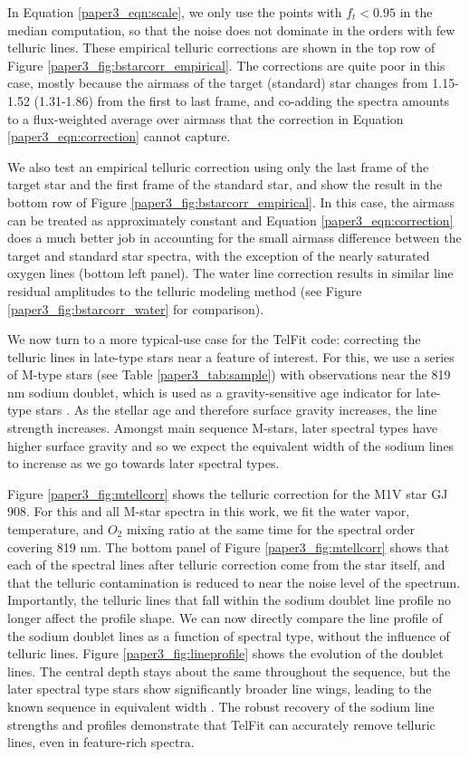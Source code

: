 In Equation \ref{paper3_eqn:scale}, we only use the points with $f_t < 0.95$ in the median computation, so that the noise does not dominate in the orders with few telluric lines. These empirical telluric corrections are shown in the top row of Figure \ref{paper3_fig:bstarcorr_empirical}. The corrections are quite poor in this case, mostly because the airmass of the target (standard) star changes from 1.15-1.52 (1.31-1.86) from the first to last frame, and co-adding the spectra amounts to a flux-weighted average over airmass that the correction in Equation \ref{paper3_eqn:correction} cannot capture. 

We also test an empirical telluric correction using only the last frame of the target star and the first frame of the standard star, and show the result in the bottom row of Figure \ref{paper3_fig:bstarcorr_empirical}. In this case, the airmass can be treated as approximately constant and Equation \ref{paper3_eqn:correction} does a much better job in accounting for the small airmass difference between the target and standard star spectra, with the exception of the nearly saturated oxygen lines (bottom left panel). The water line correction results in similar line residual amplitudes to the telluric modeling method (see Figure \ref{paper3_fig:bstarcorr_water} for comparison).


We now turn to a more typical-use case for the TelFit code: correcting the telluric lines in late-type stars near a feature of interest. For this, we use a series of M-type stars (see Table \ref{paper3_tab:sample}) with observations near the 819 nm sodium doublet, which is used as a gravity-sensitive age indicator for late-type stars \citep{Slesnick2006}. As the stellar age and therefore surface gravity increases, the line strength increases. Amongst main sequence M-stars, later spectral types have higher surface gravity and so we expect the equivalent width of the sodium lines to increase as we go towards later spectral types. 


Figure \ref{paper3_fig:mtellcorr} shows the telluric correction for the M1V star GJ 908. For this and all M-star spectra in this work, we fit the water vapor, temperature, and $O_2$ mixing ratio at the same time for the spectral order covering 819 nm. The bottom panel of Figure \ref{paper3_fig:mtellcorr} shows that each of the spectral lines after telluric correction come from the star itself, and that the telluric contamination is reduced to near the noise level of the spectrum. Importantly, the telluric lines that fall within the sodium doublet line profile no longer affect the profile shape. We can now directly compare the line profile of the sodium doublet lines as a function of spectral type, without the influence of telluric lines. Figure \ref{paper3_fig:lineprofile} shows the evolution of the doublet lines. The central depth stays about the same throughout the sequence, but the later spectral type stars show significantly broader line wings, leading to the known sequence in equivalent width \citep{Slesnick2006}. The robust recovery of the sodium line strengths and profiles demonstrate that TelFit can accurately remove telluric lines, even in feature-rich spectra. 


